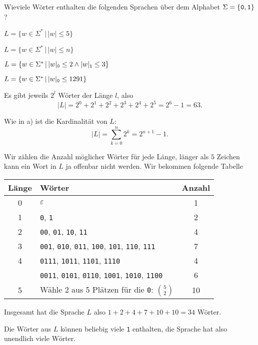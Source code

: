 Wieviele Wörter enthalten die folgenden Sprachen über dem Alphabet 
$\Sigma=\{{\tt 0}, {\tt 1}\}$?
\begin{teilaufgaben}
\item $L=\{ w\in\Sigma^*\,|\, |w|\le 5\}$
\item $L=\{ w\in\Sigma^*\,|\, |w|\le n\}$
\item $L=\{ w\in\Sigma^*\,|\,
|w|_{\tt 0}\le 2
\wedge
|w|_{\tt 1}\le 3
\}$
\item $L=\{ w\in\Sigma^*\,|\, |w|_{\tt 0}\le 1291\}$
\end{teilaufgaben}

\begin{loesung}
\begin{teilaufgaben}
\item
Es gibt jeweils $2^l$ Wörter der Länge $l$, also
\[
|L|=2^0 + 2^1+2^2+2^3+2^4+2^5=2^6-1=63.
\]
\item
Wie in a) ist die Kardinalität von $L$:
\[
|L|=\sum_{k=0}^n2^k=2^{n+1}-1.
\]
\item
Wir zählen die Anzahl möglicher Wörter für jede Länge, länger als
$5$ Zeichen kann ein Wort in $L$ ja offenbar nicht werden. Wir bekommen
folgende Tabelle
\begin{center}
\begin{tabular}{|c|l|c|}
\hline
Länge&Wörter&Anzahl\\
\hline
0&$\varepsilon$&1\\
1&{\tt 0}, {\tt 1}&2\\
2&{\tt 00}, {\tt 01}, {\tt 10}, {\tt 11}&4\\
3&{\tt 001}, {\tt 010}, {\tt 011}, {\tt 100}, {\tt 101}, {\tt 110}, {\tt 111}&7\\
4&{\tt 0111}, {\tt 1011}, {\tt 1101}, {\tt 1110}&4\\
 &{\tt 0011}, {\tt 0101}, {\tt 0110}, {\tt 1001}, {\tt 1010}, {\tt 1100}&6\\
5&Wähle 2 aus 5 Plätzen für die {\tt 0}: $\binom{5}{2}$&10\\
\hline
\end{tabular}
\end{center}
Insgesamt hat die Sprache $L$ also $1+2+4+7+10+10=34$ Wörter.
\item Die Wörter aus $L$ können beliebig viele {\tt 1} enthalten,
die Sprache hat also unendlich viele Wörter.
\qedhere
\end{teilaufgaben}
\end{loesung}
